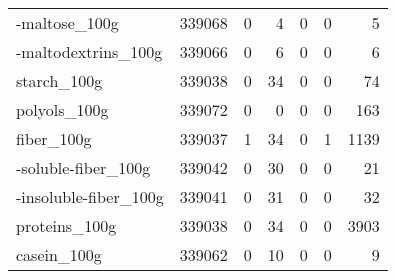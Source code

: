 \begin{tabular}{lrrrrrr}
-maltose\_100g                              &                                        339068 &                                         0 &                                             4 &                                         0 &                      0 &                5 \\
-maltodextrins\_100g                        &                                        339066 &                                         0 &                                             6 &                                         0 &                      0 &                6 \\
starch\_100g                                &                                        339038 &                                         0 &                                            34 &                                         0 &                      0 &               74 \\
polyols\_100g                               &                                        339072 &                                         0 &                                             0 &                                         0 &                      0 &              163 \\
fiber\_100g                                 &                                        339037 &                                         1 &                                            34 &                                         0 &                      1 &             1139 \\
-soluble-fiber\_100g                        &                                        339042 &                                         0 &                                            30 &                                         0 &                      0 &               21 \\
-insoluble-fiber\_100g                      &                                        339041 &                                         0 &                                            31 &                                         0 &                      0 &               32 \\
proteins\_100g                              &                                        339038 &                                         0 &                                            34 &                                         0 &                      0 &             3903 \\
casein\_100g                                &                                        339062 &                                         0 &                                            10 &                                         0 &                      0 &                9 \\

\end{tabular}
